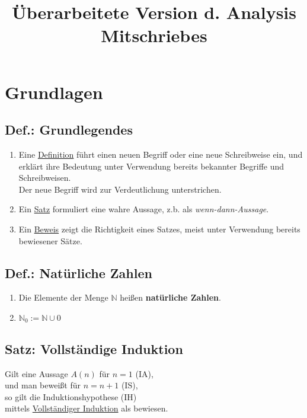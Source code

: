 \documentclass[a4paper,11pt]{article}
\title{Überarbeitete Version d. Analysis Mitschriebes}
\begin{document}
\maketitle
\tableofcontents

\section{Grundlagen}
\subsection{Def.: Grundlegendes}
\begin{enumerate}[label={\alph*)}]
	\item Eine \underline{Definition} führt einen neuen Begriff oder eine neue Schreibweise ein, und erklärt ihre Bedeutung unter Verwendung bereits bekannter Begriffe und Schreibweisen.\\
	Der neue Begriff wird zur Verdeutlichung unterstrichen.
	\item Ein \underline{Satz} formuliert eine wahre Aussage, z.b. als \emph{wenn-dann-Aussage}.
	\item Ein \underline{Beweis} zeigt die Richtigkeit eines Satzes, meist unter Verwendung bereits bewiesener Sätze.
\end{enumerate}
\subsection{Def.: Natürliche Zahlen}
\begin{enumerate}[label={\alph*)}]
	\item Die Elemente der Menge \( \mathbb{N} \) heißen \textbf{natürliche Zahlen}.
	\item \(\mathbb{N}_{0}:=\mathbb{N} \cup 0\)
\end{enumerate}
\subsection{Satz: Vollständige Induktion}
Gilt eine Aussage $A(n)$ für $n=1$ (IA),\\
und man beweißt für $n=n+1$ (IS),\\
so gilt die Induktionshypothese (IH)\\
mittels \underline{Vollständiger Induktion} als bewiesen.
\end{document}

